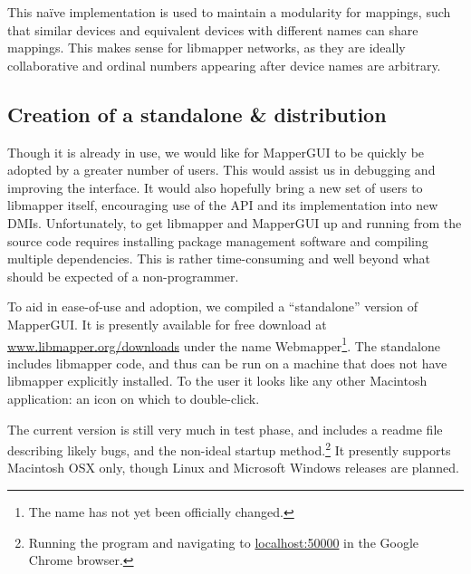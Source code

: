 This na\"ive implementation is used to maintain a modularity for mappings, such that similar devices and equivalent devices with different names can share mappings. This makes sense for libmapper networks, as they are ideally collaborative and ordinal numbers appearing after device names are arbitrary. 
	

	\subsection{Creation of a standalone \& distribution} %
	\label{sec:creation_of_a_standalone_and_distribution}
	
Though it is already in use, we would like for MapperGUI to be quickly be adopted by a greater number of users. This would assist us in debugging and improving the interface. It would also hopefully bring a new set of users to libmapper itself, encouraging use of the API and its implementation into new DMIs. Unfortunately, to get libmapper and MapperGUI up and running from the source code requires installing package management software and compiling multiple dependencies. This is rather time-consuming and well beyond what should be expected of a non-programmer. 

To aid in ease-of-use and adoption, we compiled a ``standalone'' version of MapperGUI. It is presently available for free download at \url{www.libmapper.org/downloads} under the name Webmapper\footnote{The name has not yet been officially changed.}. The standalone includes libmapper code, and thus can be run on a machine that does not have libmapper explicitly installed. To the user it looks like any other Macintosh application: an icon on which to double-click.

The current version is still very much in test phase, and includes a readme file describing likely bugs, and the non-ideal startup method.\footnote{Running the program and navigating to \url{localhost:50000} in the Google Chrome browser.} It presently supports Macintosh OSX only, though Linux and Microsoft Windows releases are planned.






